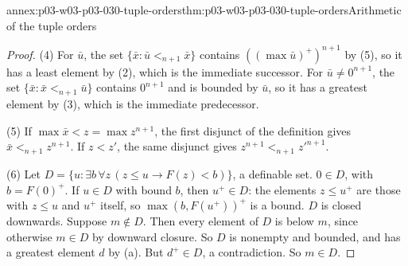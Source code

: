 \begin{annexitem}{annex:p03-w03-p03-030-tuple-orders}{thm:p03-w03-p03-030-tuple-orders}{Arithmetic of the tuple orders}
\begin{proof}
(4) For \(\bar u\), the set \(\{\bar x:\bar u<_{n+1}\bar x\}\) contains
\(((\max\bar u)^+)^{n+1}\) by (5), so it has a least element by (2), which is
the immediate successor.  For \(\bar u\ne0^{n+1}\), the set
\(\{\bar x:\bar x<_{n+1}\bar u\}\) contains \(0^{n+1}\) and is bounded by
\(\bar u\), so it has a greatest element by (3), which is the immediate
predecessor.

(5) If \(\max\bar x<z=\max z^{n+1}\), the first disjunct of the definition
gives \(\bar x<_{n+1}z^{n+1}\).  If \(z<z'\), the same disjunct gives
\(z^{n+1}<_{n+1}z'^{n+1}\).

(6) Let \(D=\{u:\exists b\,\forall z\,(z\le u\rightarrow F(z)<b)\}\), a
definable set.  \(0\in D\), with \(b=F(0)^+\).  If \(u\in D\) with bound \(b\),
then \(u^+\in D\): the elements \(z\le u^+\) are those with \(z\le u\) and
\(u^+\) itself, so \(\max(b,F(u^+))^+\) is a bound.  \(D\) is closed
downwards.  Suppose \(m\notin D\).  Then every element of \(D\) is below \(m\),
since otherwise \(m\in D\) by downward closure.  So \(D\) is nonempty and
bounded, and has a greatest element \(d\) by (a).  But \(d^+\in D\), a
contradiction.  So \(m\in D\).
\end{proof}
\end{annexitem}

